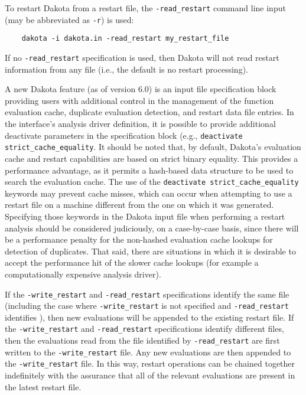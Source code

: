 To restart Dakota from a restart file, the \texttt{-read\_restart}
command line input (may be abbreviated as \texttt{-r}) is used:
\begin{small}
\begin{verbatim}
    dakota -i dakota.in -read_restart my_restart_file
\end{verbatim}
\end{small}

If no \texttt{-read\_restart} specification is used, then Dakota will
not read restart information from any file (i.e., the default is no
restart processing).

A new Dakota feature (as of version 6.0) is an input file specification block
providing users with additional control in the management of the function
evaluation cache, duplicate evaluation detection, and restart data file entries. 
In the interface’s analysis driver definition, it is possible to provide
additional deactivate parameters in the specification block
(e.g., \texttt{deactivate strict\_cache\_equality}.
It should be noted that, by default, Dakota's
evaluation cache and restart capabilities are based on strict binary equality.  
This provides a performance advantage, as it permits a hash-based data
structure to be used to search the evaluation cache.  The use of the
\texttt{deactivate strict\_cache\_equality} keywords may prevent cache misses,
which can occur when attempting to use a restart file on a machine different
from the one on which it was generated. Specifying those keywords in the Dakota
input file when performing a restart analysis should be considered
judiciously, on a case-by-case basis, since there will be a performance penalty
for the non-hashed evaluation cache lookups for detection of duplicates. That
said, there are situations in which it is desirable to accept the performance
hit of the slower cache lookups (for example a computationally expensive
analysis driver).

If the \texttt{-write\_restart} and \texttt{-read\_restart}
specifications identify the same file (including the case where
\texttt{-write\_restart} is not specified and \texttt{-read\_restart}
identifies ), then new evaluations will be appended
to the existing restart file. If the \texttt{-write\_restart} and
\texttt{-read\_restart} specifications identify different files, then
the evaluations read from the file identified by
\texttt{-read\_restart} are first written to the
\texttt{-write\_restart} file. Any new evaluations are then appended
to the \texttt{-write\_restart} file. In this way, restart operations
can be chained together indefinitely with the assurance that all of
the relevant evaluations are present in the latest restart file.

